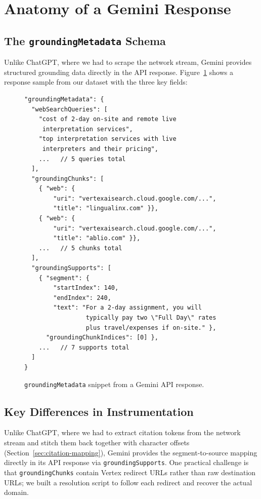 \section{Anatomy of a Gemini Response}
\label{sec:gemini-anatomy}

\subsection{The \texttt{groundingMetadata} Schema}
\label{sec:grounding-metadata}

Unlike ChatGPT, where we had to scrape the network stream, Gemini provides structured grounding data directly in the API response. Figure~\ref{fig:gemini-json} shows a response sample from our dataset with the three key fields:

\begin{figure}[htbp]
\begin{lstlisting}[language={}, basicstyle=\ttfamily\small, frame=single,
  breaklines=true, columns=flexible]
"groundingMetadata": {
  "webSearchQueries": [
    "cost of 2-day on-site and remote live
     interpretation services",
    "top interpretation services with live
     interpreters and their pricing",
    ...   // 5 queries total
  ],
  "groundingChunks": [
    { "web": {
        "uri": "vertexaisearch.cloud.google.com/...",
        "title": "lingualinx.com" }},
    { "web": {
        "uri": "vertexaisearch.cloud.google.com/...",
        "title": "ablio.com" }},
    ...   // 5 chunks total
  ],
  "groundingSupports": [
    { "segment": {
        "startIndex": 140,
        "endIndex": 240,
        "text": "For a 2-day assignment, you will
                 typically pay two \"Full Day\" rates
                 plus travel/expenses if on-site." },
      "groundingChunkIndices": [0] },
    ...   // 7 supports total
  ]
}
\end{lstlisting}
\caption{\texttt{groundingMetadata} snippet from a Gemini API response.}
\label{fig:gemini-json}
\end{figure}

\subsection{Key Differences in Instrumentation}
\label{sec:gemini-instrumentation-differences}

Unlike ChatGPT, where we had to extract citation tokens from the network stream and stitch them back together with character offsets (Section~\ref{sec:citation-mapping}), Gemini provides the segment-to-source mapping directly in its API response via \texttt{groundingSupports}. One practical challenge is that \texttt{groundingChunks} contain Vertex redirect URLs rather than raw destination URLs; we built a resolution script to follow each redirect and recover the actual domain.

